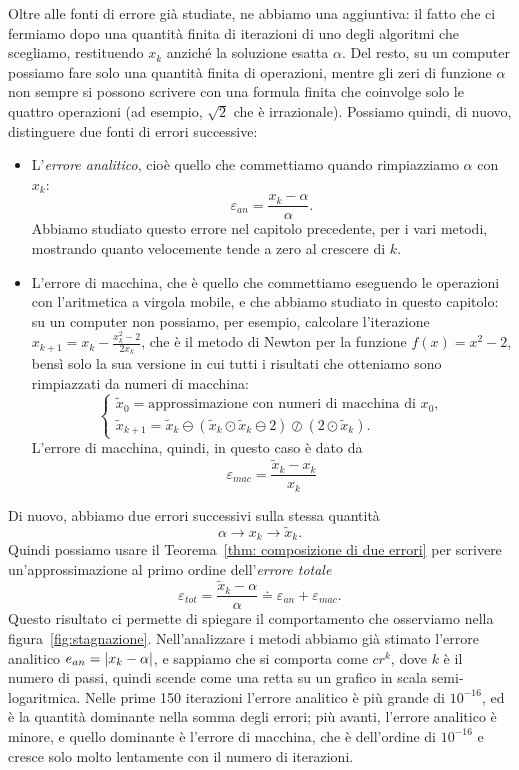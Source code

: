\documentclass[a4paper]{report}
\DeclarePairedDelimiter{\abs}{\lvert}{\rvert}
\theoremstyle{definition}
\theoremstyle{remark}
\begin{document}
Oltre alle fonti di errore già studiate, ne abbiamo una aggiuntiva: il fatto che ci fermiamo dopo una quantità finita di iterazioni di uno degli algoritmi che scegliamo, restituendo $x_k$ anziché la soluzione esatta $\alpha$. Del resto, su un computer possiamo fare solo una quantità finita di operazioni, mentre gli zeri di funzione $\alpha$ non sempre si possono scrivere con una formula finita che coinvolge solo le quattro operazioni (ad esempio, $\sqrt{2}$ che è irrazionale). Possiamo quindi, di nuovo, distinguere due fonti di errori successive:
\begin{itemize}
    \item L'\emph{errore analitico}, cioè quello che commettiamo quando rimpiazziamo $\alpha$ con $x_k$:
    \[
    \varepsilon_{an} = \frac{x_k - \alpha}{\alpha}.
    \]  
    Abbiamo studiato questo errore nel capitolo precedente, per i vari metodi, mostrando quanto velocemente tende a zero al crescere di $k$.
    \item L'errore di macchina, che è quello che commettiamo eseguendo le operazioni con l'aritmetica a virgola mobile, e che abbiamo studiato in questo capitolo: su un computer non possiamo, per esempio, calcolare l'iterazione $x_{k+1} = x_k - \frac{x_k^2-2}{2x_k}$, che è il metodo di Newton per la funzione $f(x) = x^2-2$, bensì solo la sua versione in cui tutti i risultati che otteniamo sono rimpiazzati da numeri di macchina:
    \[
    \begin{cases}
        \tilde{x}_0 = \text{approssimazione con numeri di macchina di $x_0$},\\
        \tilde{x}_{k+1} = \tilde{x}_k \ominus (\tilde{x}_k\odot \tilde{x}_k \ominus 2) \oslash (2\odot \tilde{x}_k).
    \end{cases}
    \]
    L'errore di macchina, quindi, in questo caso è dato da
    \[
    \varepsilon_{mac} = \frac{\tilde{x}_k - x_k}{x_k}
    \]
\end{itemize}
Di nuovo, abbiamo due errori successivi sulla stessa quantità
\[
\alpha \to x_k \to \tilde{x}_k.
\]
Quindi possiamo usare il Teorema~\ref{thm: composizione di due errori} per scrivere un'approssimazione al primo ordine dell'\emph{errore totale}
\[
\varepsilon_{tot} = \frac{\tilde{x}_k - \alpha}{\alpha} \doteq \varepsilon_{an} + \varepsilon_{mac}.
\]
Questo risultato ci permette di spiegare il comportamento che osserviamo nella figura~\ref{fig:stagnazione}. Nell'analizzare i metodi abbiamo già stimato l'errore analitico $e_{an} = \abs{x_k - \alpha}$, e sappiamo che si comporta come $cr^k$, dove $k$ è il numero di passi, quindi scende come una retta su un grafico in scala semi-logaritmica. Nelle prime 150 iterazioni l'errore analitico è più grande di $10^{-16}$, ed è la quantità dominante nella somma degli errori; più avanti, l'errore analitico è minore, e quello dominante è l'errore di macchina, che è dell'ordine di $10^{-16}$ e cresce solo molto lentamente con il numero di iterazioni.
\end{document}
